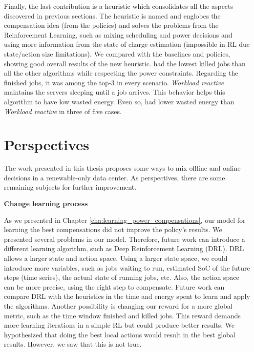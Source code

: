 Finally, the last contribution is a heuristic which consolidates all the aspects discovered in previous sections. The heuristic is named \emph{\systemName} and englobes the compensation idea (from the policies) and solves the problems from the Reinforcement Learning, such as mixing scheduling and power decisions and using more information from the state of charge estimation (impossible in RL due state/action size limitations). We compared \emph{\systemName} with the baselines and policies, showing good overall results of the new heuristic. \emph{\systemName} had the lowest killed jobs than all the other algorithms while respecting the power constraints. Regarding the finished jobs, it was among the top-3 in every scenario. \emph{Workload reactive} maintains the servers sleeping until a job arrives. This behavior helps this algorithm to have low wasted energy. Even so, \emph{\systemName} had lower wasted energy than \emph{Workload reactive} in three of five cases. 

\section{Perspectives}

The work presented in this thesis proposes some ways to mix offline and online decisions in a renewable-only data center. As perspectives, there are some remaining subjects for further improvement.

\textbf{Change learning process}

As we presented in Chapter \ref{cha:learning_power_compensations}, our model for learning the best compensations did not improve the policy's results. We presented several problems in our model. Therefore, future work can introduce a different learning algorithm, such as Deep Reinforcement Learning (DRL). DRL allows a larger state and action space. Using a larger state space, we could introduce more variables, such as jobs waiting to run, estimated SoC of the future steps (time series), the actual state of running jobs, etc. Also, the action space can be more precise, using the right step to compensate. Future work can compare DRL with the heuristics in the time and energy spent to learn and apply the algorithms. Another possibility is changing our reward for a more global metric, such as the time window finished and killed jobs. This reward demands more learning iterations in a simple RL but could produce better results. We hypothesized that doing the best local actions would result in the best global results. However, we saw that this is not true. 

